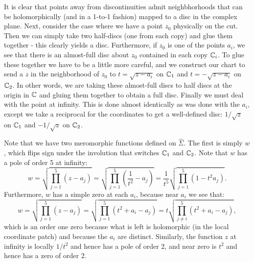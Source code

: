 \documentclass{../mathnotes}
\begin{document}
It is clear that points away from discontinuities admit neighbhorhoods that can be holomorphically (and in a 1-to-1 fashion) mapped to a disc in the complex plane.
Next, consider the case where we have a point $z_0$ physically on the cut. Then we can simply take two half-discs (one from each copy) and glue them together - this clearly
yields a disc. Furthermore, if $z_0$ is one of the points $a_i$, we see that there is an almost-full disc about $z_0$ contained in each copy $\mathbb{C}_i$. To glue these together 
we have to be a little more careful, and we construct our chart to send a $z$ in the neighborhood of $z_0$ to $t=\sqrt{z-a_i}$ on $\mathbb{C}_1$ and $t=-\sqrt{z-a_i}$ on $\mathbb{C}_2$.
In other words, we are taking these almost-full discs to half discs at the origin in $\mathbb{C}$ and gluing them together to obtain a full disc. Finally we must deal with the
point at infinity. This is done almost identically as was done with the $a_i$, except we take a reciprocal for the coordinates to get a well-defined disc: $1/\sqrt{z}$ on $\mathbb{C}_1$
and $-1/\sqrt{z}$ on $\mathbb{C}_2$.

Note that we have two meromorphic functions defined on $\hat\Sigma$. The first is simply $w$, which flips sign under the involution that switches $\mathbb{C}_1$ and $\mathbb{C}_2$. 
Note that $w$ has a pole of order 5 at infinity:
\[w=\sqrt{\prod_{j=1}^5(z-a_j)}=\sqrt{\prod_{j=1}^5\left(\frac{1}{t^2}-a_j\right)}=\frac{1}{t^5}\sqrt{\prod_{j=1}^5\left( 1-t^2a_j \right)}.\]
Furthermore, $w$ has a simple zero at each $a_i$, because near $a_i$ we see that:
\[w=\sqrt{\prod_{j=1}^5(z-a_j)}=\sqrt{\prod_{j=1}^5\left(t^2+a_i-a_j\right)}=t\sqrt{\prod_{j\neq i}^5\left( t^2+a_i-a_j \right)},\]
which is an order one zero because what is left is holomorphic (in the local coordinate patch) and because the $a_i$ are distinct.
Similarly, the function $z$ at infinity is locally $1/t^2$ and hence has a pole of order 2, and near zero is $t^2$ and hence has a zero of order 2.
\end{document}

